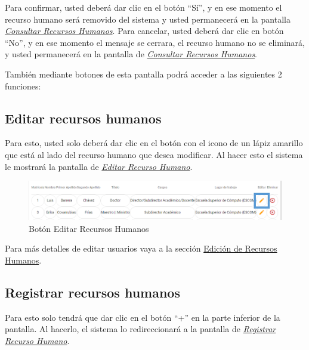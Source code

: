 \begin{enumerate}
\begin{figure}[H]
                \end{figure}

                Para confirmar, usted deberá dar clic en el botón “Sí”, y en ese momento el recurso humano será removido del sistema y usted permanecerá en la pantalla \hyperlink{consultarRH}{\textit{Consultar Recursos Humanos}}.
                Para cancelar, usted deberá dar clic en botón “No”, y en ese momento el mensaje se cerrara, el recurso humano no se eliminará, y usted permanecerá en la pantalla de \hyperlink{consultarRH}{\textit{Consultar Recursos Humanos}}.



        \end{enumerate}

        También mediante botones de esta pantalla podrá acceder a las siguientes 2 funciones:

        \subsection{Editar recursos humanos}

            Para esto, usted solo deberá dar clic en el botón con el icono de un lápiz amarillo que está al lado del recurso humano que desea modificar. Al hacer esto el sistema le mostrará la pantalla   de \hyperlink{editarRH}{\textit{Editar Recurso Humano}}.

            \begin{figure}[H]
                \centering
                \hypertarget{editar}{\includegraphics[width=0.7\linewidth]{images/SP1/BtnEditar}}
                \caption{Botón Editar Recursos Humanos}
                \label{editar}
            \end{figure}

            Para más detalles de editar usuarios vaya a la sección \hyperlink{editar-RH}{Edición de Recursos Humanos}.

        \subsection{Registrar recursos humanos}

            Para esto solo tendrá que dar clic en el botón “+” en la parte inferior de la pantalla. Al hacerlo, el sistema  lo redireccionará a la pantalla de \hyperlink{registrarRH}{\textit{Registrar Recurso Humano}}.

